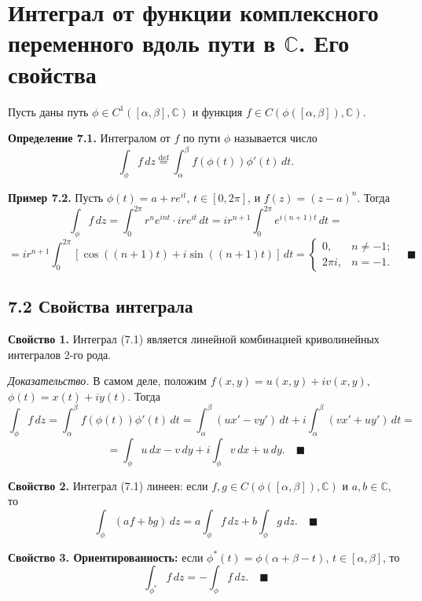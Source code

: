 \documentclass[12pt, a4paper]{article}
\theoremstyle{definition}
\theoremstyle{remark}
\begin{document}
\newpage
\section{Интеграл от функции комплексного переменного вдоль пути в $\mathbb{C}$. Его свойства}
Пусть даны путь $\phi \in C^1([\alpha, \beta], \mathbb{C})$ и функция $f \in C(\phi([\alpha, \beta]), \mathbb{C})$.

\textbf{Определение 7.1.} Интегралом от $f$ по пути $\phi$ называется число
\begin{equation}
	\int_{\phi} f \, dz \stackrel{\text{def}}{=} \int_{\alpha}^{\beta} f(\phi(t))\phi'(t) \, dt.
\end{equation}

\textbf{Пример 7.2.} Пусть $\phi(t) = a + r e^{it}$, $t \in [0, 2\pi]$, и $f(z) = (z - a)^n$. Тогда
\[
\int_{\phi} f \, dz = \int_{0}^{2\pi} r^n e^{int} \cdot ir e^{it} \, dt = ir^{n+1} \int_{0}^{2\pi} e^{i(n+1)t} \, dt =
\]
\[
= ir^{n+1} \int_{0}^{2\pi} \left[ \cos((n + 1)t) + i \sin((n + 1)t) \right] \, dt =
\begin{cases}
	0, & n \neq -1; \\
	2\pi i, & n = -1.
\end{cases} \quad \blacksquare
\]

\subsection{7.2 Свойства интеграла}

\textbf{Свойство 1.} Интеграл (7.1) является линейной комбинацией криволинейных интегралов 2-го рода.

\textit{Доказательство.} В самом деле, положим $f(x, y) = u(x, y) + iv(x, y)$, $\phi(t) = x(t) + iy(t)$. Тогда
\[
\int_{\phi} f \, dz = \int_{\alpha}^{\beta} f(\phi(t))\phi'(t) \, dt = \int_{\alpha}^{\beta} (ux' - vy') \, dt + i \int_{\alpha}^{\beta} (vx' + uy') \, dt =
\]
\[
= \int_{\phi} u \, dx - v \, dy + i \int_{\phi} v \, dx + u \, dy. \quad \blacksquare
\]

\textbf{Свойство 2.} Интеграл (7.1) линеен: если $f, g \in C(\phi([\alpha, \beta]), \mathbb{C})$ и $a, b \in \mathbb{C}$, то
\[
\int_{\phi} (af + bg) \, dz = a \int_{\phi} f \, dz + b \int_{\phi} g \, dz. \quad \blacksquare
\]

\textbf{Свойство 3. Ориентированность:} если $\phi^*(t) = \phi(\alpha + \beta - t)$, $t \in [\alpha, \beta]$, то
\[
\int_{\phi^*} f \, dz = - \int_{\phi} f \, dz. \quad \blacksquare
\]
\end{document}
